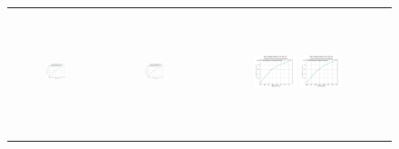 \begin{figure}[p]
    \centering
    \begin{tabular}{ccc}
         \includegraphics[height=36mm,width=0.24\textwidth]{Images/simulation_no_obs/coverage_plots/01.png}
        & \includegraphics[height=36mm,width=0.24\textwidth]{Images/simulation_no_obs/coverage_plots/02.png}
        & \includegraphics[height=36mm,width=0.24\textwidth]{Images/simulation_no_obs/coverage_plots/03.png}
         \includegraphics[height=36mm,width=0.24\textwidth]{Images/simulation_no_obs/coverage_plots/04.png}\\[-4pt]


\end{tabular}
\end{figure}
